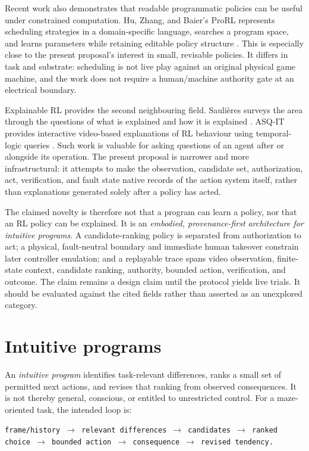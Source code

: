 \documentclass[11pt]{article}
\begin{document}
Recent work also demonstrates that readable programmatic policies can be useful
under constrained computation. Hu, Zhang, and Baier's ProRL represents
scheduling strategies in a domain-specific language, searches a program space,
and learns parameters while retaining editable policy structure
\cite{hu2026}. This is especially close to the present proposal's interest in
small, revisable policies. It differs in task and substrate: scheduling is not
live play against an original physical game machine, and the work does not
require a human/machine authority gate at an electrical boundary.

Explainable RL provides the second neighbouring field. Saulières surveys the
area through the questions of what is explained and how it is explained
\cite{saulieres2025}. ASQ-IT provides interactive video-based explanations of
RL behaviour using temporal-logic queries \cite{amitai2025}. Such work is
valuable for asking questions of an agent after or alongside its operation. The
present proposal is narrower and more infrastructural: it attempts to make the
observation, candidate set, authorization, act, verification, and fault state
native records of the action system itself, rather than explanations generated
solely after a policy has acted.

The claimed novelty is therefore not that a program can learn a policy, nor
that an RL policy can be explained. It is an \emph{embodied, provenance-first
architecture for intuitive programs}. A candidate-ranking policy is separated
from authorization to act; a physical, fault-neutral boundary and immediate
human takeover constrain later controller emulation; and a replayable trace
spans video observation, finite-state context, candidate ranking, authority,
bounded action, verification, and outcome. The claim remains a design claim
until the protocol yields live trials. It should be evaluated against the cited
fields rather than asserted as an unexplored category.

\section{Intuitive programs}

An \emph{intuitive program} identifies task-relevant differences, ranks a small
set of permitted next actions, and revises that ranking from observed
consequences. It is not thereby general, conscious, or entitled to unrestricted
control. For a maze-oriented task, the intended loop is:

\begin{center}
\texttt{frame/history $\rightarrow$ relevant differences $\rightarrow$ candidates
$\rightarrow$ ranked choice $\rightarrow$ bounded action $\rightarrow$ consequence
$\rightarrow$ revised tendency.}
\end{center}
\end{document}
